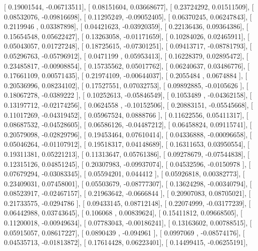 \documentclass{article}
\begin{document}
       [ 0.19001544, -0.06713511],
       [ 0.08151604,  0.03668677],
       [ 0.23724292,  0.01511509],
       [ 0.08532076, -0.09816698],
       [ 0.11295249, -0.09052405],
       [ 0.06370245,  0.06247843],
       [ 0.2119946 ,  0.03387898],
       [ 0.04421623, -0.03920359],
       [ 0.22136436,  0.09364386],
       [ 0.15654548,  0.05622427],
       [ 0.13263058, -0.01171659],
       [ 0.10284026,  0.02465911],
       [ 0.05043057,  0.01727248],
       [ 0.18725615, -0.07301251],
       [ 0.09413717, -0.08781793],
       [ 0.05296763, -0.05796912],
       [ 0.0471199 ,  0.05953413],
       [ 0.16228379,  0.02895472],
       [ 0.23485817, -0.00908854],
       [ 0.15735562,  0.05017762],
       [ 0.06240637,  0.03486776],
       [ 0.17661109,  0.00571435],
       [ 0.21974109, -0.00644037],
       [ 0.2055484 ,  0.0674884 ],
       [ 0.20536996,  0.08234102],
       [ 0.17527551,  0.07032753],
       [ 0.09892885, -0.0105626 ],
       [ 0.18067278, -0.0389222 ],
       [ 0.10252613, -0.05846549],
       [ 0.1053489 , -0.04362158],
       [ 0.13197712, -0.02174256],
       [ 0.0624558 , -0.10152506],
       [ 0.20883151, -0.05545668],
       [ 0.11017269, -0.04319452],
       [ 0.05967524,  0.0888766 ],
       [ 0.11622556,  0.05411317],
       [ 0.08687532, -0.04528605],
       [ 0.06586126, -0.04487212],
       [ 0.06458824,  0.09115741],
       [ 0.20579098, -0.02829796],
       [ 0.19453464,  0.07610414],
       [ 0.04336888, -0.00096658],
       [ 0.05046264, -0.01107912],
       [ 0.19518317,  0.04148689],
       [ 0.16311653,  0.03950554],
       [ 0.19311381,  0.05221213],
       [ 0.11313647,  0.05761386],
       [ 0.09278679, -0.07544838],
       [ 0.12315126,  0.04851245],
       [ 0.20307983, -0.09937074],
       [ 0.04532596, -0.0150978 ],
       [ 0.07679294, -0.03083345],
       [ 0.05594201,  0.044412  ],
       [ 0.05926818,  0.00382773],
       [ 0.23409031,  0.07458001],
       [ 0.05503679, -0.08777307],
       [ 0.13624298, -0.00340794],
       [ 0.08523917, -0.02467157],
       [ 0.21963642, -0.0666844 ],
       [ 0.20907083,  0.08705021],
       [ 0.21733575, -0.0294786 ],
       [ 0.09433145,  0.08712148],
       [ 0.22074999, -0.03177239],
       [ 0.06442988,  0.03743645],
       [ 0.106068  ,  0.00839624],
       [ 0.15411812,  0.09668505],
       [ 0.11200018, -0.00949634],
       [ 0.07783043, -0.00186241],
       [ 0.13163602,  0.00788515],
       [ 0.05915057,  0.08617227],
       [ 0.0890439 , -0.094961  ],
       [ 0.0997069 , -0.08574176],
       [ 0.04535713, -0.01813872],
       [ 0.17614428,  0.06223401],
       [ 0.14499415, -0.06255191],
\end{document}
